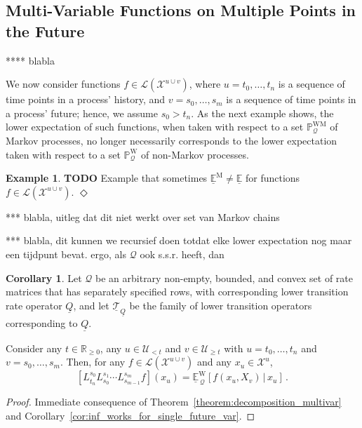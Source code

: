 \documentclass[10pt]{paper}
\theoremstyle{definition}
\newtheorem{exmp}{Example}%
\newtheorem{corollary}[theorem]{Corollary}
\newcommand{\reals}{\mathbb{R}}
\newcommand{\realsnonneg}{\reals_{\geq 0}}
\newcommand{\states}{\mathcal{X}}
\newcommand{\processes}{\mathbb{P}}
\newcommand{\wprocesses}{\processes^{\mathrm{W}}}
\newcommand{\wmprocesses}{\processes^{\mathrm{WM}}}
\newcommand{\gambles}{\mathcal{L}}
\newcommand{\rateset}{\mathcal{Q}}
\newcommand{\lrate}{\underline{Q}}
\newcommand{\exampleend}{\hfill$\Diamond$}
\begin{document}
\subsection{Multi-Variable Functions on Multiple Points in the Future}\label{sec:decomposition}

**** blabla

We now consider functions $f\in\gambles(\states^{u\cup v})$, where $u=t_0,\ldots,t_n$ is a sequence of time points in a process' history, and $v=s_0,\ldots,s_m$ is a sequence of time points in a process' future; hence, we assume $s_0>t_n$. As the next example shows, the lower expectation of such functions, when taken with respect to a set $\wmprocesses_\rateset$ of Markov processes, no longer necessarily corresponds to the lower expectation taken with respect to a set $\wprocesses_\rateset$ of non-Markov processes.

\begin{exmp}
{\bf TODO} Example that sometimes $\underline{\mathbb{E}}^\mathrm{M}\neq \underline{\mathbb{E}}$ for functions $f\in\gambles(\states^{u\cup v})$.
\exampleend
\end{exmp}


*** blabla, uitleg dat dit niet werkt over set van Markov chains

*** blabla, dit kunnen we recursief doen totdat elke lower expectation nog maar een tijdpunt bevat. ergo, als $\rateset$ ook s.s.r. heeft, dan

\begin{corollary}\label{cor:composition_lower_trans}
Let $\rateset$ be an arbitrary non-empty, bounded, and convex set of rate matrices that has separately specified rows, with corresponding lower transition rate operator $\lrate$, and let $\underline{\mathcal{T}}_{\lrate}$ be the family of lower transition operators corresponding to $\lrate$. 

Consider any $t\in\realsnonneg$, any $u\in\mathcal{U}_{<t}$ and $v\in\mathcal{U}_{\geq t}$ with $u=t_0,\ldots,t_n$ and $v={s_0,\ldots,s_m}$. Then, for any $f\in\gambles(\states^{u\cup v})$ and any $x_u\in\states^u$,
\begin{equation}\label{eq:composition_lower_trans}
\left[L_{t_n}^{s_0}L_{s_0}^{s_1}\cdots L_{s_{m-1}}^{s_m}f\right](x_u) = \underline{\mathbb{E}}^{\mathrm{W}}_{\,\rateset}[f(x_u,X_v)\,\vert\,x_u]\,.
\end{equation}
\end{corollary}
\begin{proof}
Immediate consequence of Theorem~\ref{theorem:decomposition_multivar} and Corollary~\ref{cor:inf_works_for_single_future_var}.
\end{proof}
\end{document}
